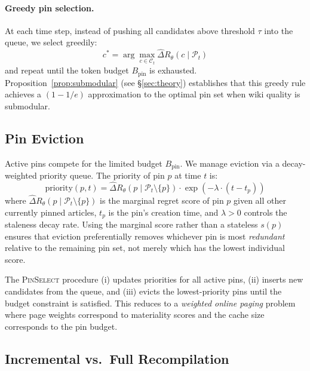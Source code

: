 \documentclass{article}
\newcommand{\pt}{\mathcal{P}_t}
\begin{document}
\paragraph{Greedy pin selection.}
At each time step, instead of pushing all candidates above threshold $\tau$ into the queue, we select greedily:
\begin{equation}
  c^* = \arg\max_{c \in \mathcal{C}_t} \hat{\Delta}R_\theta(c \mid \pt)
  \label{eq:greedy_select}
\end{equation}
and repeat until the token budget $B_{\text{pin}}$ is exhausted.
Proposition~\ref{prop:submodular} (see \S\ref{sec:theory}) establishes that this greedy rule achieves a $(1-1/e)$ approximation to the optimal pin set when wiki quality is submodular.

\subsection{Pin Eviction}
\label{sec:eviction}

Active pins compete for the limited budget $B_{\text{pin}}$.
We manage eviction via a decay-weighted priority queue.
The priority of pin $p$ at time $t$ is:
\begin{equation}
  \text{priority}(p, t) = \hat{\Delta}R_\theta(p \mid \pt \setminus \{p\}) \cdot \exp\!\left(-\lambda \cdot (t - t_p)\right)
  \label{eq:priority}
\end{equation}
where $\hat{\Delta}R_\theta(p \mid \pt \setminus \{p\})$ is the marginal regret score of pin $p$ given all other currently pinned articles, $t_p$ is the pin's creation time, and $\lambda > 0$ controls the staleness decay rate.
Using the marginal score rather than a stateless $s(p)$ ensures that eviction preferentially removes whichever pin is most \emph{redundant} relative to the remaining pin set, not merely which has the lowest individual score.

The \textsc{PinSelect} procedure (i) updates priorities for all active pins, (ii) inserts new candidates from the queue, and (iii) evicts the lowest-priority pins until the budget constraint is satisfied.
This reduces to a \emph{weighted online paging} problem~\citep{fiat1998competitive, bansal2012weighted} where page weights correspond to materiality scores and the cache size corresponds to the pin budget.

\subsection{Incremental vs.\ Full Recompilation}
\end{document}
